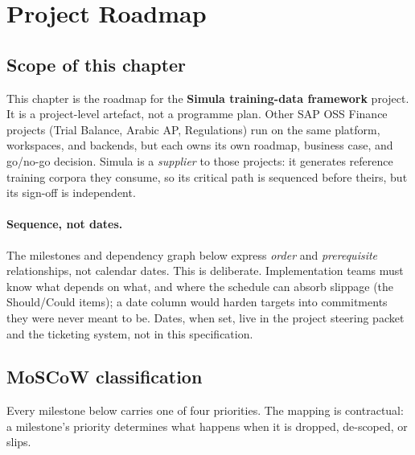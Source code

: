 \section{Project Roadmap}\label{sec:sim-roadmap}

\subsection*{Scope of this chapter}

This chapter is the roadmap for the \textbf{Simula training-data
framework} project. It is a project-level artefact, not a programme
plan. Other SAP OSS Finance projects (Trial Balance, Arabic AP,
Regulations) run on the same platform, workspaces, and backends, but
each owns its own roadmap, business case, and go/no-go decision.
Simula is a \emph{supplier} to those projects: it generates reference
training corpora they consume, so its critical path is sequenced
before theirs, but its sign-off is independent.

\paragraph{Sequence, not dates.}
The milestones and dependency graph below express \emph{order} and
\emph{prerequisite} relationships, not calendar dates. This is
deliberate. Implementation teams must know what depends on what, and
where the schedule can absorb slippage (the Should/Could items); a
date column would harden targets into commitments they were never
meant to be. Dates, when set, live in the project steering packet and
the ticketing system, not in this specification.

\subsection{MoSCoW classification}\label{sec:sim-moscow}

Every milestone below carries one of four priorities. The mapping is
contractual: a milestone's priority determines what happens when it is
dropped, de-scoped, or slips.

